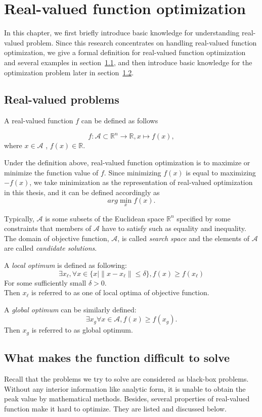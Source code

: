 \chapter{Real-valued function optimization}
\label{ch:real-valued function optimization}

In this chapter, we first briefly introduce basic knowledge for understanding real-valued problem.
Since this research concentrates on handling real-valued function optimization, we give a formal definition for real-valued function optimization and several examples in section~\ref{sec:problem define}, and then introduce basic knowledge for the optimization problem later in section~\ref{sec:problem difficulty}. 


\section{Real-valued problems}
\label{sec:problem define}
A real-valued function $f$ can be defined as follows

\[f \colon \mathcal{A} \subset \mathbb{R}^n \to \mathbb{R} , x \mapsto f(x),\] where $x \in \mathcal{A}$ , $f(x) \in \mathbb{R}$.

Under the definition above, real-valued function optimization is to maximize or minimize the function value of $f$.
Since minimizing $f(x)$ is equal to maximizing $-f(x)$, we take minimization as the representation of real-valued optimization in this thesis, and it can be defined accordingly as \[arg\min_xf(x).\]

Typically, $\mathcal{A}$ is some subsets of the Euclidean space $\mathbb{R}^n$ specified by some constraints that members of $\mathcal{A}$ have to satisfy such as equality and inequality.
The domain of objective function, $\mathcal{A}$, is called \emph{search space} and the elements of $\mathcal{A}$ are called \emph{candidate solutions}.

A \emph{local optimum} is defined as following:
 \[\exists x_\ell, \forall x \in \{x\mid \|x-x_\ell\| \leq \delta \},  f(x) \geq f(x_\ell)\] For some sufficiently small $\delta > 0$. \\
Then $x_\ell$ is referred to as one of local optima of objective function.

A \emph{global optimum} can be similarly defined:
\[\exists x_g \forall x \in \mathcal{A}, f(x) \geq f(x_g).\]
Then $x_g$ is referred to as global optimum.

\section{What makes the function difficult to solve}
\label{sec:problem difficulty}
Recall that the problems we try to solve are considered as black-box problems.
Without any interior information like analytic form, it is unable to
obtain the peak value by mathematical methods.
Besides, several properties of real-valued function make it hard to optimize.
They are listed and discussed below.

